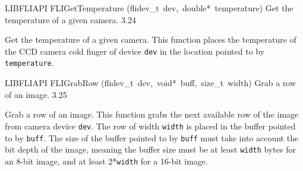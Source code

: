 \documentclass{article}
\begin{document}
\begin{cxxentry}
\begin{cxxfunction}
\begin{cxxdoc}
\end{cxxdoc}
\end{cxxfunction}
\begin{cxxfunction}
{LIBFLIAPI}
        {FLIGetTemperature}
        {(flidev\_t\ dev,\ double*\ temperature)}
        { Get the temperature of a given camera.}
        {3.24}
\begin{cxxdoc}

Get the temperature of a given camera.  This function places the
temperature of the CCD camera cold finger of device \texttt{dev} in
the location pointed to by \texttt{temperature}.


\end{cxxdoc}
\end{cxxfunction}
\begin{cxxfunction}
{LIBFLIAPI}
        {FLIGrabRow}
        {(flidev\_t\ dev,\ void*\ buff,\ size\_t\ width)}
        { Grab a row of an image.}
        {3.25}
\begin{cxxdoc}

Grab a row of an image.  This function grabs the next available row
of the image from camera device \texttt{dev}.  The row of width
\texttt{width} is placed in the buffer pointed to by \texttt{buff}.
The size of the buffer pointed to by \texttt{buff} must take into
account the bit depth of the image, meaning the buffer size must be
at least \texttt{width} bytes for an 8-bit image, and at least
2*\texttt{width} for a 16-bit image.



\end{cxxdoc}
\end{cxxfunction}
\end{cxxentry}
\end{document}
